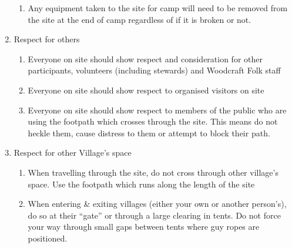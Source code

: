 \documentclass[a4paper, 11pt]{report}
\begin{document}
\begin{enumerate}
\begin{enumerate}
            \item Any equipment taken to the site for camp will need to be removed from the site at the end of camp regardless of if it is broken or not.
        \end{enumerate}
        \item Respect for others
        \begin{enumerate}
            \item Everyone on site should show respect and consideration for other participants, volunteers (including stewards) and Woodcraft Folk staff
            \item Everyone on site should show respect to organised visitors on site
            \item Everyone on site should show respect to members of the public who are using the footpath which crosses through the site. This means do not heckle them, cause distress to them or attempt to block their path.
        \end{enumerate}
        \item Respect for other Village's space
        \begin{enumerate}
            \item When travelling through the site, do not cross through other village's space. Use the footpath which runs along the length of the site
            \item When entering \& exiting villages (either your own or another person's), do so at their ``gate'' or through a large clearing in tents. Do not force your way through small gaps between tents where guy ropes are positioned.
        \end{enumerate}
    \end{enumerate}

    \backPage
\end{document}
